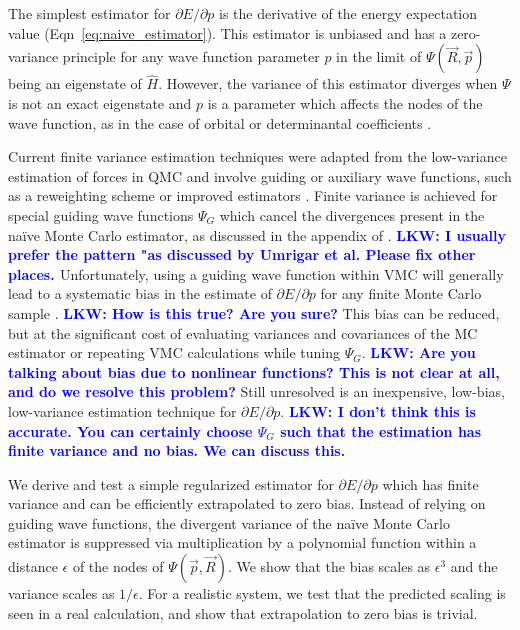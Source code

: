 \documentclass[twocolumn]{revtex4-1}
\newcommand{\lucas}[1]{\textbf{\textcolor{blue}{LKW: #1}}}
\begin{document}
The simplest estimator for $\partial E/\partial p$ is the derivative of the energy expectation value (Eqn~\ref{eq:naive_estimator}).
This estimator is unbiased and has a zero-variance principle for any wave function parameter $p$ in the limit of $\Psi(\vec{R}, \vec{p})$ being an eigenstate of $\hat{H}$.
However, the variance of this estimator diverges when $\Psi$ is not an exact eigenstate and $p$ is a parameter which affects the nodes of the wave function, as in the case of orbital or determinantal coefficients \cite{Avella, doi:10.1063/1.4933112}.

Current finite variance estimation techniques were adapted from the low-variance estimation of forces in QMC \cite{doi:10.1063/1.462059, doi:10.1063/1.3516208, Phys2016} and involve guiding or auxiliary wave functions, such as a reweighting scheme \cite{Avella, Attaccalite2008, Zen2013} or improved estimators \cite{Assaraf1999, doi:10.1063/1.1286598, Assaraf2003}.
Finite variance is achieved for special guiding wave functions $\Psi_G$ which cancel the divergences present in the na\"ive Monte Carlo estimator, as discussed in the appendix of \cite{doi:10.1063/1.4933112}.
\lucas{I usually prefer the pattern "as discussed by Umrigar et al.\cite{doi:10.1063/1.4933112} Please fix other places. }
Unfortunately, using a guiding wave function within VMC will generally lead to a systematic bias in the estimate of $\partial E/\partial p$ for any finite Monte Carlo sample \cite{doi:10.1063/1.4933112, Toulouse2015}.
\lucas{How is this true? Are you sure?}
This bias can be reduced, but at the significant cost of evaluating variances and covariances of the MC estimator \cite{Toulouse2015} or repeating VMC calculations while tuning $\Psi_G$.
\lucas{Are you talking about bias due to nonlinear functions? This is not clear at all, and do we resolve this problem?}
Still unresolved is an inexpensive, low-bias, low-variance estimation technique for $\partial E/\partial p$.
\lucas{I don't think this is accurate. You can certainly choose $\Psi_G$ such that the estimation has finite variance and no bias. We can discuss this.}

We derive and test a simple regularized estimator for $\partial E/\partial p$ which has finite variance and can be efficiently extrapolated to zero bias.
Instead of relying on guiding wave functions, the divergent variance of the na\"ive Monte Carlo estimator is suppressed via multiplication by a polynomial function within a distance $\epsilon$ of the nodes of $\Psi(\vec{p}, \vec{R})$. 
We show that the bias scales as $\epsilon^3$ and the variance scales as $1/\epsilon$. 
For a realistic system, we test that the predicted scaling is seen in a real calculation, and show that extrapolation to zero bias is trivial.
\end{document}
